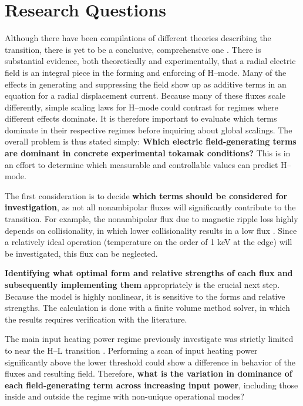 \section{Research Questions}\label{sec:research_questions}
Although there have been compilations of different theories describing the transition, there is yet to be a conclusive, comprehensive one \cite{connor_review_2000}.
There is substantial evidence, both theoretically and experimentally, that a radial electric field is an integral piece in the forming and enforcing of H--mode.
Many of the effects in generating and suppressing the field show up as additive terms in an equation for a radial displacement current.
Because many of these fluxes scale differently, simple scaling laws for H--mode could contrast for regimes where different effects dominate.
It is therefore important to evaluate which terms dominate in their respective regimes before inquiring about global scalings.
The overall problem is thus stated simply: \textbf{Which electric field-generating terms are dominant in concrete experimental tokamak conditions?}
This is in an effort to determine which measurable and controllable values can predict H--mode.

The first consideration is to decide \textbf{which terms should be considered for investigation}, as not all nonambipolar fluxes will significantly contribute to the transition.
For example, the nonambipolar flux due to magnetic ripple loss highly depends on collisionality, in which lower collisionality results in a low flux \cite{stringer_effect_1972}.
Since a relatively ideal operation (temperature on the order of 1 keV at the edge) will be investigated, this flux can be neglected.

\textbf{Identifying what optimal form and relative strengths of each flux and subsequently implementing them} appropriately is the crucial next step.
Because the model is highly nonlinear, it is sensitive to the forms and relative strengths.
The calculation is done with a finite volume method solver, in which the results requires verification with the literature.

The main input heating power regime previously investigate was strictly limited to near the H--L transition \cite{staps_backstepping_2017}.
Performing a scan of input heating power significantly above the lower threshold could show a difference in behavior of the fluxes and resulting field.
Therefore, \textbf{what is the variation in dominance of each field-generating term across increasing input power}, including those inside and outside the regime with non-unique operational modes?

